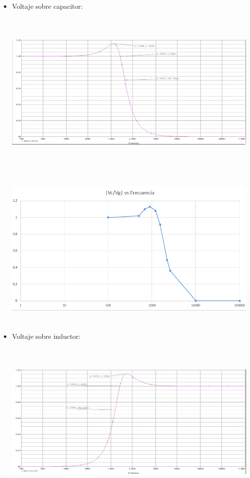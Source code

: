 \documentclass[12pt]{article}
\begin{document}
\begin{enumerate}
\begin{itemize}
    		\item Voltaje sobre capacitor:
    		
    		\begin{center}
    			\includegraphics[width=16cm,height=8cm]{Img/vc}
    		\end{center}
    		
    		\begin{center}
    			\includegraphics[width=16cm,height=8cm]{Img/graph_3}
    		\end{center}
    		
    		\item Voltaje sobre inductor:
    		
    		\begin{center}
    			\includegraphics[width=16cm,height=8cm]{Img/vl}
    		\end{center}
    		

\end{itemize}
\end{enumerate}
\end{document}
